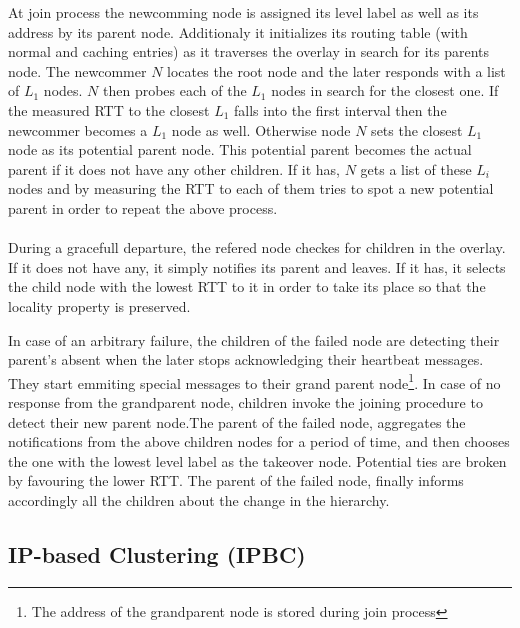 \documentclass[a4paper,10pt]{article}
\begin{document}
At join process the newcomming node is assigned its level label as well as its address by its parent node. Additionaly it initializes its routing table (with normal and caching entries) as it traverses the overlay in search for its parents node.
The newcommer $N$ locates the root node and the later responds with a list of $L_1$ nodes. $N$ then probes each of the $L_1$ nodes in search for the closest one. If the measured RTT to the closest $L_1$ falls into the first interval then the newcommer becomes a $L_1$ node as well. Otherwise node $N$ sets the closest $L_1$ node as its potential parent node. This potential parent becomes the actual parent if it does not have any other children. If it has, $N$ gets a list of these $L_i$ nodes and by measuring the RTT to each of them tries to spot a new potential parent in order to repeat the above process.

\paragraph{}
During a gracefull departure, the refered node checkes for children in the overlay. If it does not have any, it simply notifies its parent and leaves. If it has, it selects the child node with the lowest RTT to it in order to take its place so that the locality property is preserved.

In case of an arbitrary failure, the children of the failed node are detecting their parent's absent when the later stops acknowledging their heartbeat messages. They start emmiting special messages to their grand parent node\footnote{The address of the grandparent node is stored during join process}. In case of no response from the grandparent node, children invoke the joining procedure to detect their new parent node.The parent of the failed node, aggregates the notifications from the above children nodes for a period of time, and then chooses the one with the lowest level label as the takeover node. Potential ties are broken by favouring the lower RTT. The parent of the failed node, finally informs accordingly all the children about the change in the hierarchy.

\subsection{IP-based Clustering (IPBC)}
\end{document}
